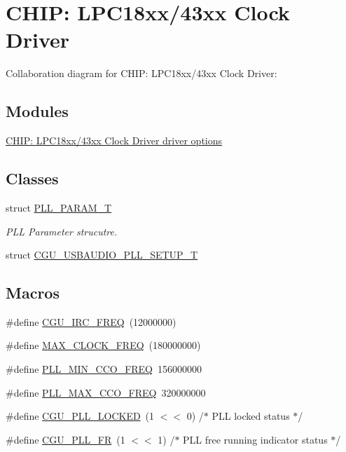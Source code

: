 \hypertarget{group___c_l_o_c_k__18_x_x__43_x_x}{}\section{C\+H\+IP\+: L\+P\+C18xx/43xx Clock Driver}
\label{group___c_l_o_c_k__18_x_x__43_x_x}
Collaboration diagram for C\+H\+IP\+: L\+P\+C18xx/43xx Clock Driver\+:
\subsection*{Modules}
\begin{DoxyCompactItemize}
\item 
\hyperlink{group___c_l_o_c_k__18_x_x__43_x_x___o_p_t_i_o_n_s}{C\+H\+I\+P\+: L\+P\+C18xx/43xx Clock Driver driver options}
\end{DoxyCompactItemize}
\subsection*{Classes}
\begin{DoxyCompactItemize}
\item 
struct \hyperlink{struct_p_l_l___p_a_r_a_m___t}{P\+L\+L\+\_\+\+P\+A\+R\+A\+M\+\_\+T}
\begin{DoxyCompactList}\small\item\em P\+LL Parameter strucutre. \end{DoxyCompactList}\item 
struct \hyperlink{struct_c_g_u___u_s_b_a_u_d_i_o___p_l_l___s_e_t_u_p___t}{C\+G\+U\+\_\+\+U\+S\+B\+A\+U\+D\+I\+O\+\_\+\+P\+L\+L\+\_\+\+S\+E\+T\+U\+P\+\_\+T}
\end{DoxyCompactItemize}
\subsection*{Macros}
\begin{DoxyCompactItemize}
\item 
\#define \hyperlink{group___c_l_o_c_k__18_x_x__43_x_x_gaec3e2b28e900580cc4dc72034f7371fd}{C\+G\+U\+\_\+\+I\+R\+C\+\_\+\+F\+R\+EQ}~(12000000)
\item 
\#define \hyperlink{group___c_l_o_c_k__18_x_x__43_x_x_gae14be49570b87fcba70e698abd87549e}{M\+A\+X\+\_\+\+C\+L\+O\+C\+K\+\_\+\+F\+R\+EQ}~(180000000)
\item 
\#define \hyperlink{group___c_l_o_c_k__18_x_x__43_x_x_ga1b275f6e0df5d06ec980f9da9e3a1f02}{P\+L\+L\+\_\+\+M\+I\+N\+\_\+\+C\+C\+O\+\_\+\+F\+R\+EQ}~156000000
\item 
\#define \hyperlink{group___c_l_o_c_k__18_x_x__43_x_x_ga30bea6f91385c809e9b69f60bb76e463}{P\+L\+L\+\_\+\+M\+A\+X\+\_\+\+C\+C\+O\+\_\+\+F\+R\+EQ}~320000000
\item 
\#define \hyperlink{group___c_l_o_c_k__18_x_x__43_x_x_ga8d7042242ace9a2ae21d16181ce51a2d}{C\+G\+U\+\_\+\+P\+L\+L\+\_\+\+L\+O\+C\+K\+ED}~(1 $<$$<$ 0)	/$\ast$ P\+LL locked status $\ast$/
\item 
\#define \hyperlink{group___c_l_o_c_k__18_x_x__43_x_x_gafa8279d333ad3959b13d9ad5c57787df}{C\+G\+U\+\_\+\+P\+L\+L\+\_\+\+FR}~(1 $<$$<$ 1)	/$\ast$ P\+LL free running indicator status $\ast$/
\end{DoxyCompactItemize}
